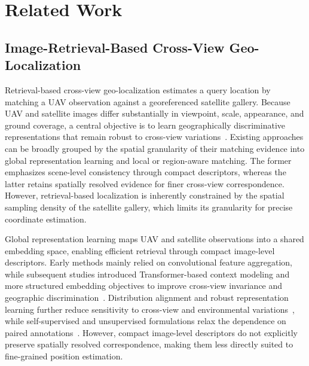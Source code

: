 \documentclass[runningheads]{llncs}
\begin{document}
\section{Related Work}

\subsection{Image-Retrieval-Based Cross-View Geo-Localization}

Retrieval-based cross-view geo-localization estimates a query location by matching a UAV observation against a georeferenced satellite gallery. Because UAV and satellite images differ substantially in viewpoint, scale, appearance, and ground coverage, a central objective is to learn geographically discriminative representations that remain robust to cross-view variations~\cite{durgam2024survey}. Existing approaches can be broadly grouped by the spatial granularity of their matching evidence into global representation learning and local or region-aware matching. The former emphasizes scene-level consistency through compact descriptors, whereas the latter retains spatially resolved evidence for finer cross-view correspondence. However, retrieval-based localization is inherently constrained by the spatial sampling density of the satellite gallery, which limits its granularity for precise coordinate estimation.

Global representation learning maps UAV and satellite observations into a shared embedding space, enabling efficient retrieval through compact image-level descriptors. Early methods mainly relied on convolutional feature aggregation, while subsequent studies introduced Transformer-based context modeling and more structured embedding objectives to improve cross-view invariance and geographic discrimination~\cite{hu2019image,shi2019cvft,zhu2022transgeo,deuser2023sample4geo,yang2026ecsnet,zhang2026dycl}. Distribution alignment and robust representation learning further reduce sensitivity to cross-view and environmental variations~\cite{liu2023pvda,liu2025eagle,wen2026fanet,meng2026tbn}, while self-supervised and unsupervised formulations relax the dependence on paired annotations~\cite{chen2026dmnil,amadei2026caevl,chen2026uniabg}. However, compact image-level descriptors do not explicitly preserve spatially resolved correspondence, making them less directly suited to fine-grained position estimation.
\end{document}
